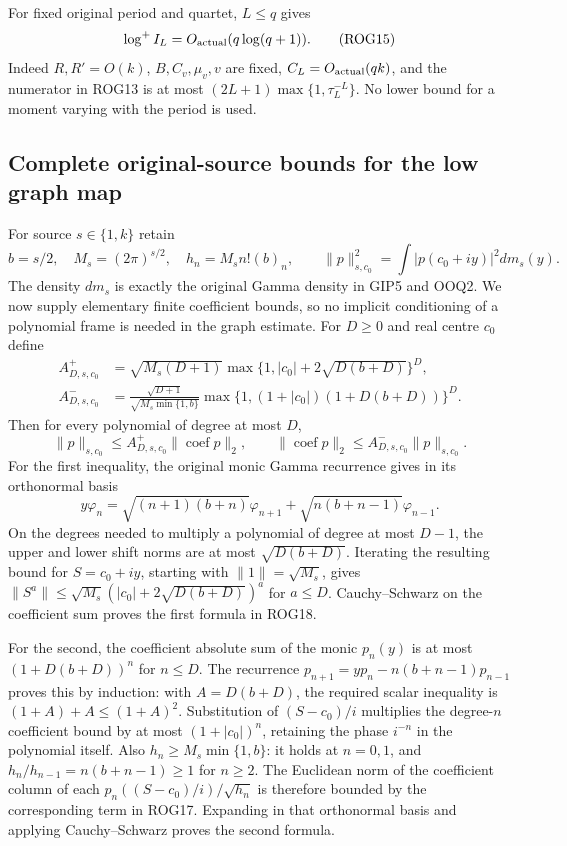 \documentclass[11pt,a4paper]{article}
\begin{document}
For fixed original period and quartet, $L\le q$ gives
\[
 \log^+ I_L=O_{\rm actual}(q\log(q+1)).
 \tag{ROG15}
\]
Indeed $R,R'=O(k)$, $B,C_v,\mu_v,v$ are fixed,
$C_L=O_{\rm actual}(qk)$, and the numerator in ROG13 is
at most $(2L+1)\max\{1,\tau_L^{-L}\}$. No lower bound
for a moment varying with the period is used.

\subsection{Complete original-source bounds for the low graph map}

For source $s\in\{1,k\}$ retain
\[
 b=s/2,\quad M_s=(2\pi)^{s/2},\quad h_n=M_sn!(b)_n,
 \qquad \|p\|_{s,c_0}^2=\int|p(c_0+iy)|^2dm_s(y).
 \tag{ROG16}
\]
The density $dm_s$ is exactly the original Gamma density in
GIP5 and OOQ2. We now supply elementary finite coefficient
bounds, so no implicit conditioning of a polynomial frame is
needed in the graph estimate.
For $D\ge0$ and real centre $c_0$ define
\[
 \begin{split}
 A^+_{D,s,c_0}
  &=\sqrt{M_s(D+1)}
      \max\{1,|c_0|+2\sqrt{D(b+D)}\}^{D},\\
 A^-_{D,s,c_0}
  &=\frac{\sqrt{D+1}}{\sqrt{M_s\min\{1,b\}}}
      \max\{1,(1+|c_0|)(1+D(b+D))\}^{D}.
 \end{split}\tag{ROG17}
\]
Then for every polynomial of degree at most $D$,
\[
 \|p\|_{s,c_0}\le A^+_{D,s,c_0}\|\operatorname{coef}p\|_2,
 \qquad
 \|\operatorname{coef}p\|_2\le A^-_{D,s,c_0}\|p\|_{s,c_0}.
 \tag{ROG18}
\]
For the first inequality, the original monic Gamma recurrence
gives in its orthonormal basis
\[
 y\varphi_n=\sqrt{(n+1)(b+n)}\varphi_{n+1}
             +\sqrt{n(b+n-1)}\varphi_{n-1}.
\]
On the degrees needed to multiply a polynomial of degree at
most $D-1$, the upper and lower shift norms are at most
$\sqrt{D(b+D)}$. Iterating the resulting bound for
$S=c_0+iy$, starting with $\|1\|=\sqrt{M_s}$, gives
$\|S^a\|\le\sqrt{M_s}(|c_0|+2\sqrt{D(b+D)})^a$
for $a\le D$. Cauchy--Schwarz on the coefficient sum proves
the first formula in ROG18.

For the second, the coefficient absolute sum of the monic
$p_n(y)$ is at most $(1+D(b+D))^n$ for $n\le D$.
The recurrence $p_{n+1}=yp_n-n(b+n-1)p_{n-1}$ proves this
by induction: with $A=D(b+D)$, the required scalar inequality
is $(1+A)+A\le(1+A)^2$. Substitution of $(S-c_0)/i$
multiplies the degree-$n$ coefficient bound by at most
$(1+|c_0|)^n$, retaining the phase $i^{-n}$ in the polynomial
itself. Also $h_n\ge M_s\min\{1,b\}$: it holds at
$n=0,1$, and $h_n/h_{n-1}=n(b+n-1)\ge1$ for $n\ge2$.
The Euclidean norm of the coefficient column of each
$p_n((S-c_0)/i)/\sqrt{h_n}$ is therefore bounded by the
corresponding term in ROG17. Expanding in that orthonormal
basis and applying Cauchy--Schwarz proves the second formula.
\end{document}
